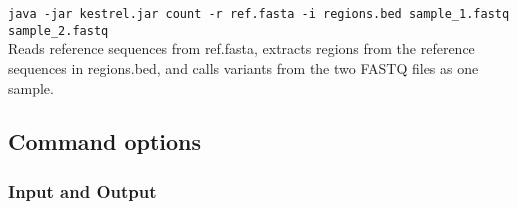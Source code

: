 \texttt{java -jar kestrel.jar count -r ref.fasta -i regions.bed sample\_1.fastq sample\_2.fastq}\\
\hspace*{1cm}Reads reference sequences from ref.fasta, extracts regions from the reference sequences in regions.bed, and calls variants from the two FASTQ files as one sample.


\subsection{Command options}
\label{sec.cmdline.opts}


\subsubsection{Input and Output}
\label{sec.cmdline.opts.io}

